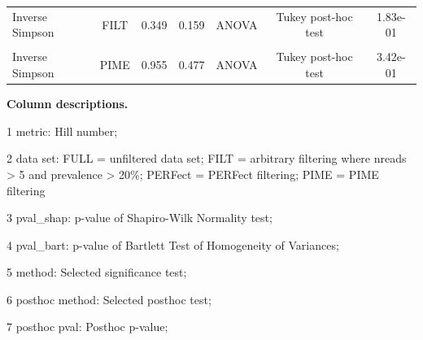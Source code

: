 \documentclass[
  10pt,
  letterpaper,
  DIV=11,
  numbers=noendperiod]{scrartcl}
\begin{document}
\begin{table}[H]
\begin{threeparttable}
\begin{tabular}[t]{lccclcc}
Inverse Simpson & FILT & 0.349 & 0.159 & ANOVA & Tukey post-hoc test & 1.83e-01\\
\cellcolor{gray!6}{Inverse Simpson} & \cellcolor{gray!6}{PERFect} & \cellcolor{gray!6}{0.961} & \cellcolor{gray!6}{0.236} & \cellcolor{gray!6}{ANOVA} & \cellcolor{gray!6}{Tukey post-hoc test} & \cellcolor{gray!6}{2.05e-01}\\
Inverse Simpson & PIME & 0.955 & 0.477 & ANOVA & Tukey post-hoc test & 3.42e-01\\
\bottomrule
\end{tabular}
\begin{tablenotes}[para]
\item \textbf{Column descriptions. } 
\item 
\item[1] metric: Hill number; 
\item[2] data set: FULL = unfiltered data set; FILT = arbitrary filtering where nreads > 5 and prevalence > 20\%; PERFect = PERFect filtering; PIME = PIME filtering
\item[3] pval\_shap: p-value of Shapiro-Wilk Normality test; 
\item[4] pval\_bart: p-value of Bartlett Test of Homogeneity of Variances; 
\item[5] method: Selected significance test; 
\item[6] posthoc method: Selected posthoc test; 
\item[7] posthoc pval: Posthoc p-value; 
\end{tablenotes}
\end{threeparttable}
\end{table}

\newpage{}
\end{document}
